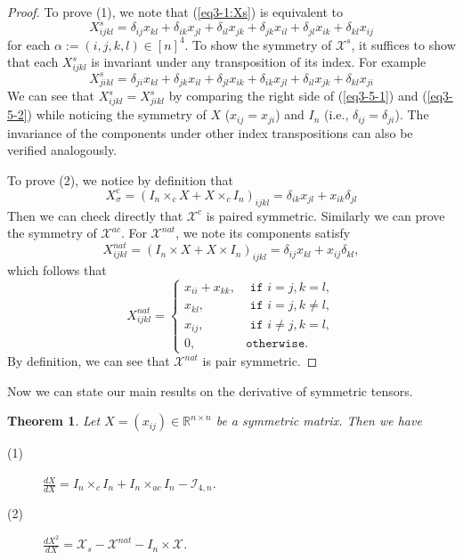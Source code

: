 \documentclass[11pt, oneside]{article}  %
\newtheorem{thm}{Theorem}[section]
\newcommand{\al}{\alpha}
\newcommand{\si}{\sigma}
\newcommand{\RR}{\mathbb{R}}
\newcommand{\caI}{\mathcal{I}}
\newcommand{\X}{\mathcal{X}}
\newcommand{\beq}{\begin{equation}}
\newcommand{\eeq}{\end{equation}}
\begin{document}
\begin{proof}
To prove (1), we note that (\ref{eq3-1:Xs}) is equivalent to  
\beq\label{eq3-5-1}
X^{s}_{ijkl}=\delta_{ij}x_{kl}+\delta_{ik}x_{jl} +\delta_{il}x_{jk} +\delta_{jk}x_{il} + \delta_{jl}x_{ik} +\delta_{kl}x_{ij}  
\eeq
for each $\al:=(i,j,k,l)\in [n]^{4}$.  To show the symmetry of $\X^{s}$, it suffices to show that  each $X^{s}_{ijkl}$ is invariant under any transposition of its index.  For example
\beq\label{eq3-5-2}
X^{s}_{jikl}=\delta_{ji}x_{kl}+\delta_{jk}x_{il} +\delta_{jl}x_{ik} +\delta_{ik}x_{jl} + \delta_{il}x_{jk} +\delta_{kl}x_{ji}  
\eeq
We can see that $X^{s}_{ijkl}=X^{s}_{jikl}$ by comparing the right side of (\ref{eq3-5-1}) and (\ref{eq3-5-2}) while noticing the symmetry of $X$
($x_{ij}=x_{ji}$) and $I_{n}$ (i.e., $\delta_{ij}=\delta_{ji}$).  The invariance of the components under other index transpositions can also be verified 
analogously. \par 
\indent  To prove (2), we notice by definition that 
\beq\label{eq3-3-5} 
X^{c}_{\si}= (I_{n}\times_{c} X+X\times_{c} I_{n})_{ijkl} = \delta_{ik}x_{jl}+x_{ik}\delta_{jl} 
\eeq
Then we can check directly that $\X^{c}$ is paired symmetric.  Similarly we can prove the symmetry of  $\X^{ac}$.  For $\X^{nat}$, we note 
its components satisfy 
\[
 X^{nat}_{ijkl} = (I_{n}\times X+X\times I_{n})_{ijkl} = \delta_{ij}x_{kl} + x_{ij}\delta_{kl}, \]
 which follows that 
\[
X^{nat}_{ijkl} = \begin{cases}
x_{ii} +x_{kk},  & \texttt{  if\ }  i=j, k=l,\\
x_{kl},  & \texttt{  if\ }  i=j, k\neq l,\\
x_{ij},   & \texttt{ if\ }  i\neq j, k=l,\\ 
0,           & \texttt {otherwise}. 
\end{cases}
\]
By definition, we can see that $\X^{nat}$ is pair symmetric.
\end{proof}

Now we can state our main results on the derivative of symmetric tensors. 
\begin{thm}\label{th3-5}
Let $X=(x_{ij})\in\RR^{n\times n}$ be a symmetric matrix. Then we have 
\begin{description}
\item[(1)] $\frac{dX}{dX} = I_{n}\times_{c} I_{n} +I_{n}\times_{ac} I_{n} -\caI_{4,n}$. 
\item[(2)] $\frac{d X^{2}}{dX} = \X_{s} - \X^{nat} - I_{n}\times \X $.  
\end{description}
\end{thm}
\end{document}
